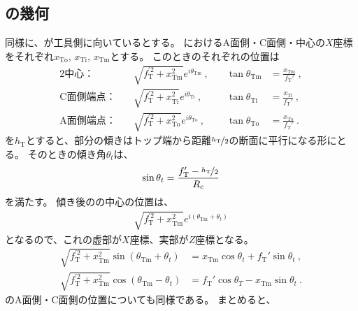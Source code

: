 \subsection{\TopCurvedOutcut の幾何}
同様に、\TopEndFace が工具側に向いているとする。
\TopEndFace におけるA面側・C面側・中心の$X$座標をそれぞれ$x_\mathrm{To}$, $x_\mathrm{Ti}$, $x_\mathrm{Tm}$とする。
このとき\TopEndFace のそれぞれの位置は
\begin{alignat*}{2}
  \text{中心：}&\quad
  \sqrt{f_\mathrm T^{'2}+x_\mathrm{Tm}^2}e^{i\theta_\mathrm{Tm}}~, \quad &
  \tan\theta_\mathrm{Tm} &= \frac{x_\mathrm{Tm}}{f_\mathrm T'}\ ,\\
  \text{C面側端点：}&\quad
  \sqrt{f_\mathrm T^{'2}+x_\mathrm{Ti}^2}e^{i\theta_\mathrm{Ti}}~, \quad &
  \tan\theta_\mathrm{Ti} &= \frac{x_\mathrm{Ti}}{f_\mathrm T'}\ ,\\
  \text{A面側端点：}&\quad
  \sqrt{f_\mathrm T^{'2}+x_\mathrm{To}^2}e^{i\theta_\mathrm{To}}~, \quad &
  \tan\theta_\mathrm{To} &= \frac{x_\mathrm{To}}{f_\mathrm T'}\ .
\end{alignat*}
\TopOutcutLength を$h_\mathrm T$とすると、\nameCurvedOutcut 部分の傾きはトップ端から距離$\nicefrac{h_\mathrm T}2$の断面に平行になる形にとる。
そのときの傾き角$\theta_t$は、
\begin{align}
  \label{eq:TCurvedOutcutAngle}
  \sin\theta_t = \frac{f_\mathrm T'-\nicefrac{h_\mathrm T}2}{R_\mathrm c}
\end{align}
を満たす。
傾き後の\nameTopEndFace の中心の位置は、
\begin{align*}
  \sqrt{f_\mathrm T^{'2}+x_\mathrm{Tm}^2}e^{i(\theta_\mathrm{Tm}+\theta_t)}
\end{align*}
となるので、これの虚部が$X$座標、実部が$Z$座標となる。
\begin{align*}
  \sqrt{f_\mathrm T^{'2}+x_\mathrm{Tm}^2}\sin(\theta_\mathrm{Tm}+\theta_t)
  &= x_\mathrm{Tm}\cos\theta_t+f_\mathrm T'\sin\theta_t~,\\
  \sqrt{f_\mathrm T^{'2}+x_\mathrm{Tm}^2}\cos(\theta_\mathrm{Tm}-\theta_t)
  &= f_\mathrm T'\cos\theta_T-x_\mathrm{Tm}\sin\theta_t~.
\end{align*}
\TopEndFace のA面側・C面側の位置についても同様である。
まとめると、
